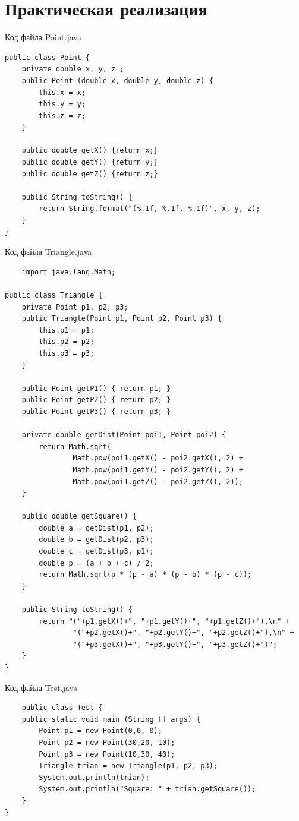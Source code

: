 \documentclass[a4paper, 14pt]{extarticle}
\begin{document}
\section{Практическая реализация}
Код файла Point.java
\begin{lstlisting}
public class Point {
    private double x, y, z ;
    public Point (double x, double y, double z) {
        this.x = x;
        this.y = y;
        this.z = z;
    }

    public double getX() {return x;}
    public double getY() {return y;}
    public double getZ() {return z;}

    public String toString() {
        return String.format("(%.1f, %.1f, %.1f)", x, y, z);
    }
}
\end{lstlisting}
\par
Код файла Triangle.java
\begin{lstlisting}
    import java.lang.Math;

public class Triangle {
    private Point p1, p2, p3;
    public Triangle(Point p1, Point p2, Point p3) {
        this.p1 = p1;
        this.p2 = p2;
        this.p3 = p3;
    }

    public Point getP1() { return p1; }
    public Point getP2() { return p2; }
    public Point getP3() { return p3; }

    private double getDist(Point poi1, Point poi2) {
        return Math.sqrt(
                Math.pow(poi1.getX() - poi2.getX(), 2) +
                Math.pow(poi1.getY() - poi2.getY(), 2) +
                Math.pow(poi1.getZ() - poi2.getZ(), 2));
    }

    public double getSquare() {
        double a = getDist(p1, p2);
        double b = getDist(p2, p3);
        double c = getDist(p3, p1);
        double p = (a + b + c) / 2;
        return Math.sqrt(p * (p - a) * (p - b) * (p - c));
    }

    public String toString() {
        return "("+p1.getX()+", "+p1.getY()+", "+p1.getZ()+"),\n" +
                "("+p2.getX()+", "+p2.getY()+", "+p2.getZ()+"),\n" +
                "("+p3.getX()+", "+p3.getY()+", "+p3.getZ()+")";
    }
}
\end{lstlisting}
\par
Код файла Test.java
\begin{lstlisting}
    public class Test {
    public static void main (String [] args) {
        Point p1 = new Point(0,0, 0);
        Point p2 = new Point(30,20, 10);
        Point p3 = new Point(10,30, 40);
        Triangle trian = new Triangle(p1, p2, p3);
        System.out.println(trian);
        System.out.println("Square: " + trian.getSquare());
    }
}
\end{lstlisting}
\end{document}
